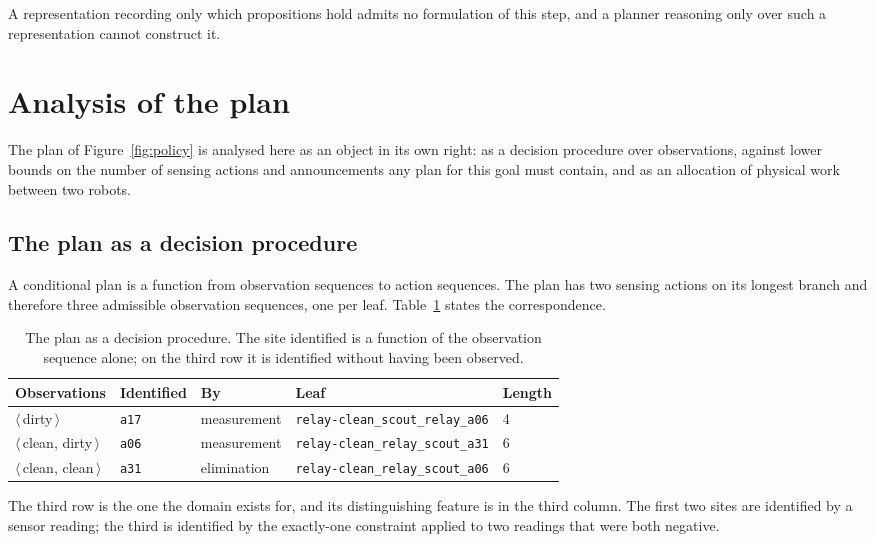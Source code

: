 \documentclass[11pt,a4paper]{article}
\theoremstyle{definition}
\newcommand{\code}[1]{\texttt{\small #1}}
\newcommand{\site}[1]{\code{#1}}
\begin{document}
A representation recording only which propositions hold admits no
formulation of this step, and a planner reasoning only over such a
representation cannot construct it.

\section{Analysis of the plan}
\label{sec:plananalysis}

The plan of Figure~\ref{fig:policy} is analysed here as an object in its own
right: as a decision procedure over observations, against lower bounds on the
number of sensing actions and announcements any plan for this goal must
contain, and as an allocation of physical work between two robots.

\subsection{The plan as a decision procedure}

A conditional plan is a function from observation sequences to action
sequences. The plan has two sensing actions on its longest branch and therefore
three admissible observation sequences, one per leaf.
Table~\ref{tab:decision} states the correspondence.

\begin{table}[H]
\centering\small
\caption{The plan as a decision procedure. The site identified is a function of
the observation sequence alone; on the third row it is identified without
having been observed.}
\label{tab:decision}
\begin{tabular}{@{}lllll@{}}
\toprule
\textbf{Observations} & \textbf{Identified} & \textbf{By} & \textbf{Leaf}
  & \textbf{Length} \\
\midrule
$\langle\,$dirty$\,\rangle$
  & \site{a17} & measurement
  & \code{relay-clean\_scout\_relay\_a06} & 4 \\
$\langle\,$clean, dirty$\,\rangle$
  & \site{a06} & measurement
  & \code{relay-clean\_relay\_scout\_a31} & 6 \\
$\langle\,$clean, clean$\,\rangle$
  & \site{a31} & elimination
  & \code{relay-clean\_relay\_scout\_a06} & 6 \\
\bottomrule
\end{tabular}
\end{table}

The third row is the one the domain exists for, and its distinguishing feature
is in the third column. The first two sites are identified by a sensor reading;
the third is identified by the exactly-one constraint applied to two readings
that were both negative.
\end{document}
